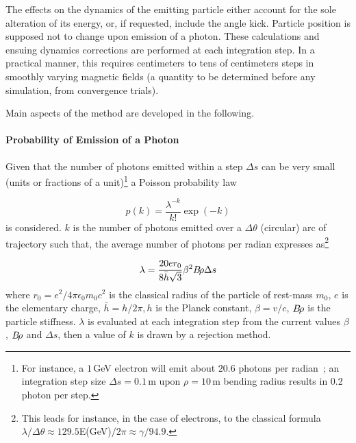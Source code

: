 \noindent The effects on the dynamics of the emitting particle 
 either account for the sole  alteration of its  energy, or, if requested, include the angle kick.
Particle position is supposed not to  change upon emission of a photon. These calculations 
 and ensuing dynamics corrections are performed at 
 each integration step. In a practical manner, this requires 
 centimeters  to tens of centimeters steps in smoothly varying magnetic fields (a quantity to 
be determined before any simulation, from convergence trials). 

\medskip 


\noindent Main aspects of the method are developed in the following. 



\paragraph{Probability of Emission of a Photon}

Given that the number of photons emitted within a step $\Delta s$ can be very small  (units or fractions 
of a unit)\footnote{For instance, a $1\,$GeV electron will emit about $20.6$ photons per radian~; an 
 integration step size $\Delta s =0.1\,$m upon $\rho=10\,$m bending radius results in 0.2 photon  
per step.} a Poisson probability law 

\begin{equation}
	\label{EqPoiss}
 p(k) = \dfrac{\lambda^{-k}}{k!} \exp(-k)
\end{equation}
%
is considered. $k$ is the number of photons emitted over a $\Delta \theta$ (circular) arc of 
trajectory  such that, the average number of photons per radian expresses as\footnote{This leads for 
instance, in the case of electrons, to the classical formula $\lambda/\Delta \theta \approx
129.5$E(GeV)$/2\pi\approx \gamma/94.9$.}

\begin{equation}
        \label{EqPoissMean}
 \lambda = \dfrac{20 e r_0 }{8 \bar{h} \sqrt{3}  } \beta^2 B\!\rho  \Delta s
\end{equation}
%
where $r_0=e^2/4\pi \epsilon_0 m_0 c^2$ is the classical radius of the particle of rest-mass $m_0$, 
$e$ is the elementary 
charge, $\bar{h} = h/2\pi , h$ is the Planck constant, $\beta = v/c$, $B\!\rho$ is the particle 
stiffness. $\lambda$ is evaluated at each integration step from the current values $\beta$, $B\!\rho$ 
and $\Delta s$,  then a value of $k$ is drawn by a rejection method.  


